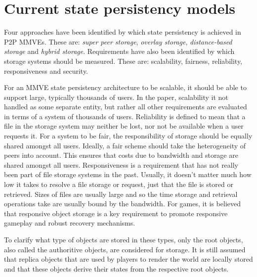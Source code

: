 \documentclass[10pt,a4paper,conference]{IEEEtran}
\begin{document}
\section{Current state persistency models}
\label{current_models}

Four approaches have been identified by which state persistency is achieved in P2P MMVEs. These are: \emph{super peer storage}, \emph{overlay
storage}, \emph{distance-based storage} and \emph{hybrid storage}. Requirements have also been identified by which storage systems should be
measured. These are: scalability, fairness, reliability, responsiveness and security.

For an MMVE state persistency architecture to be scalable, it should be able to support large, typically thousands of users. In the paper,
scalability it not handled as some separate entity, but rather all other requirements are evaluated in terms of a system of thousands of users.
Reliability is defined to mean that a file in the storage system may neither be lost, nor not be available when a user requests it.
For a system to be fair, the responsibility of storage should be equally shared amongst all users. Ideally, a fair scheme should take the
heterogeneity of peers into account. This ensures that costs due to bandwidth and storage are shared amongst all users.
Responsiveness is a requirement that has not really been part of file storage systems in the past. Usually, it doesn't matter much how low it takes
to resolve a file storage or request, just that the file is stored or retrieved. Sizes of files are usually large and so the time storage and
retrieval operations take are usually bound by the bandwidth. For games, it is believed that responsive object storage is a key requirement to
promote responsive gameplay and robust recovery mechanisms.

To clarify what type of objects are stored in these types, only the root objects, also called the authoritive objects, are considered for storage. It
is still assumed that replica objects that are used by players to render the world are locally stored and that these objects derive their states from
the respective root objects.
\end{document}
